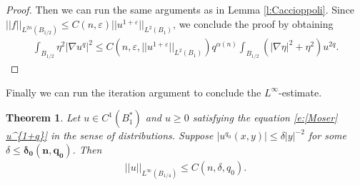 \documentclass[11pt,reqno]{amsart}
\numberwithin{equation}{section}
\newtheorem{theorem}[thm]{Theorem}
\theoremstyle{definition}
\theoremstyle{remark}
\begin{document}
\begin{proof}
Then we can run the same arguments as in Lemma \ref{l:Caccioppoli}. Since $||f||_{L^{2n}(B_{1/2})} \leqslant C(n,\varepsilon) ||u^{1+\varepsilon}||_{L^2(B_1)}$, we conclude the proof by obtaining
\begin{align}
    \int_{B_{1/2}} \eta^2 |\nabla u^q|^2 \leqslant C(n,\varepsilon,||u^{1+\varepsilon}||_{L^{2}(B_1)}) q^{\alpha(n)} \int_{B_{1/2}} (|\nabla \eta|^2 + \eta^2) u^{2q}.
\end{align}
\end{proof}

Finally we can run the iteration argument to conclude the $L^{\infty}$-estimate.

\begin{theorem}\label{t:Local Moser}
    Let $u \in C^1(B_1^*)$ and $u \geqslant 0$ satisfying the equation \eqref{e:[Moser] u^{1+q}} in the sense of distributions. Suppose $|u^{q_0}(x,y) | \leqslant \delta |y|^{-2}$ for some $\delta \leqslant \mathbf{\delta_0(n,q_0)}$. Then
    \begin{align}
        ||u||_{L^{\infty}(B_{1/4})} \leqslant C(n,\delta,q_0).
    \end{align}
\end{theorem}
\end{document}
